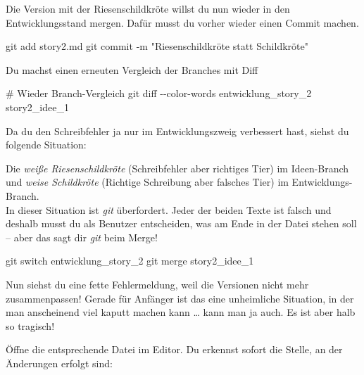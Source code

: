 \documentclass[
  ngerman,
  letterpaper,
  DIV=11]{scrreprt}
\newenvironment{Shaded}{\begin{snugshade}}{\end{snugshade}}
\newcommand{\AttributeTok}[1]{\textcolor[rgb]{0.40,0.45,0.13}{#1}}
\newcommand{\CommentTok}[1]{\textcolor[rgb]{0.37,0.37,0.37}{#1}}
\newcommand{\FunctionTok}[1]{\textcolor[rgb]{0.28,0.35,0.67}{#1}}
\newcommand{\NormalTok}[1]{\textcolor[rgb]{0.00,0.23,0.31}{#1}}
\newcommand{\StringTok}[1]{\textcolor[rgb]{0.13,0.47,0.30}{#1}}
\newcommand{\git}{\textit{git}\xspace}
\begin{document}
Die Version mit der Riesenschildkröte willst du nun wieder in den
Entwicklungsstand mergen. Dafür musst du vorher wieder einen Commit
machen.

\begin{Shaded}
\begin{Highlighting}[]
\FunctionTok{git}\NormalTok{ add story2.md }
\FunctionTok{git}\NormalTok{ commit }\AttributeTok{{-}m} \StringTok{"Riesenschildkröte statt Schildkröte"}
\end{Highlighting}
\end{Shaded}

Du machst einen erneuten Vergleich der Branches mit Diff

\begin{Shaded}
\begin{Highlighting}[]
\CommentTok{\# Wieder Branch{-}Vergleich }
\FunctionTok{git}\NormalTok{ diff }\AttributeTok{{-}{-}color{-}words}\NormalTok{ entwicklung\_story\_2 story2\_idee\_1}
\end{Highlighting}
\end{Shaded}

Da du den Schreibfehler ja nur im Entwicklungszweig verbessert hast,
siehst du folgende Situation:

Die \emph{weiße Riesenschildkröte} (Schreibfehler aber richtiges Tier)
im Ideen-Branch und \emph{weise Schildkröte} (Richtige Schreibung aber
falsches Tier) im Entwicklungs-Branch.\\
In dieser Situation ist \git überfordert. Jeder der beiden Texte ist
falsch und deshalb musst du als Benutzer entscheiden, was am Ende in der
Datei stehen soll -- aber das sagt dir \git  beim Merge!

\begin{Shaded}
\begin{Highlighting}[]
\FunctionTok{git}\NormalTok{ switch entwicklung\_story\_2}
\FunctionTok{git}\NormalTok{ merge story2\_idee\_1}
\end{Highlighting}
\end{Shaded}

Nun siehst du eine fette Fehlermeldung, weil die Versionen nicht mehr
zusammenpassen! Gerade für Anfänger ist das eine unheimliche Situation,
in der man anscheinend viel kaputt machen kann \ldots{} kann man ja
auch. Es ist aber halb so tragisch!

Öffne die entsprechende Datei im Editor. Du erkennst sofort die Stelle,
an der Änderungen erfolgt sind:
\end{document}
